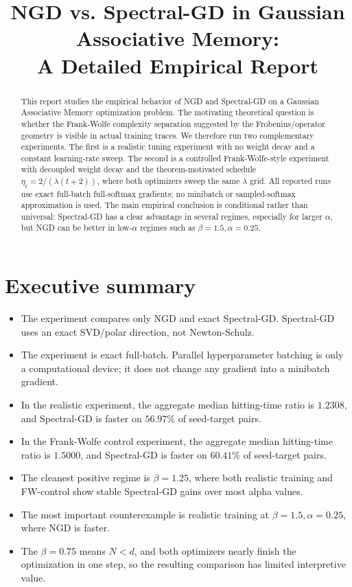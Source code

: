 \documentclass[11pt]{article}
\title{NGD vs. Spectral-GD in Gaussian Associative Memory:\\A Detailed Empirical Report}
\begin{document}
\maketitle

\begin{abstract}
This report studies the empirical behavior of NGD and Spectral-GD on a Gaussian Associative Memory optimization problem. The motivating theoretical question is whether the Frank-Wolfe complexity separation suggested by the Frobenius/operator geometry is visible in actual training traces. We therefore run two complementary experiments. The first is a realistic tuning experiment with no weight decay and a constant learning-rate sweep. The second is a controlled Frank-Wolfe-style experiment with decoupled weight decay and the theorem-motivated schedule $\eta_t=2/(\lambda(t+2))$, where both optimizers sweep the same $\lambda$ grid. All reported runs use exact full-batch full-softmax gradients; no minibatch or sampled-softmax approximation is used. The main empirical conclusion is conditional rather than universal: Spectral-GD has a clear advantage in several regimes, especially for larger $\alpha$, but NGD can be better in low-$\alpha$ regimes such as $\beta=1.5,\alpha=0.25$.
\end{abstract}

\tableofcontents


\section{Executive summary}

\begin{itemize}[leftmargin=*]
  \item The experiment compares only NGD and exact Spectral-GD. Spectral-GD uses an exact SVD/polar direction, not Newton-Schulz.
  \item The experiment is exact full-batch. Parallel hyperparameter batching is only a computational device; it does not change any gradient into a minibatch gradient.
  \item In the realistic experiment, the aggregate median hitting-time ratio is $1.2308$, and Spectral-GD is faster on $56.97\%$ of seed-target pairs.
  \item In the Frank-Wolfe control experiment, the aggregate median hitting-time ratio is $1.5000$, and Spectral-GD is faster on $60.41\%$ of seed-target pairs.
  \item The cleanest positive regime is $\beta=1.25$, where both realistic training and FW-control show stable Spectral-GD gains over most alpha values.
  \item The most important counterexample is realistic training at $\beta=1.5,\alpha=0.25$, where NGD is faster.
  \item The $\beta=0.75$ means $N<d$, and both optimizers nearly finish the optimization in one step, so the resulting comparison has limited interpretive value.
\end{itemize}
\end{document}
